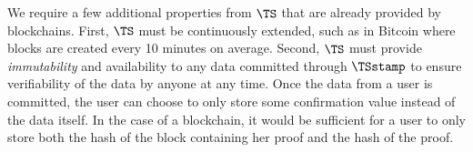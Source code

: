 We require a few additional properties from \(\TS\) that are already provided by blockchains.
First, \(\TS\) must be continuously extended, such as in Bitcoin where blocks are created every 10 minutes on average.
Second, \(\TS\) must provide \emph{immutability} and availability to any data committed through \(\TSstamp\) to ensure verifiability of the data by anyone at any time.
Once the data from a user is committed, the user can choose to only store some confirmation value instead of the data itself.
In the case of a blockchain, it would be sufficient for a user to only store both the hash of the block containing her proof and the hash of the proof. 


